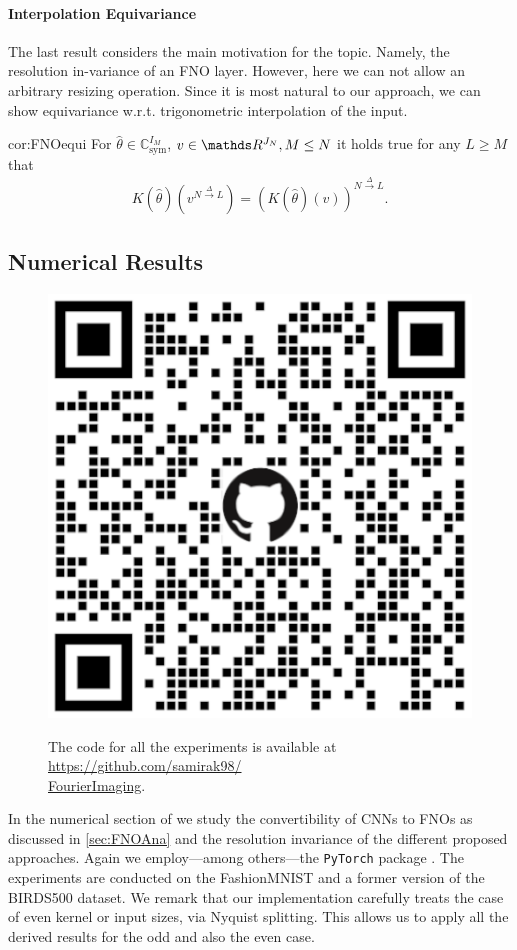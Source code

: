\paragraph{Interpolation Equivariance}
%
%
The last result considers the main motivation for the topic. Namely, the resolution in-variance of an FNO layer. However, here we can not allow an arbitrary resizing operation. Since it is most natural to our approach, we can show equivariance w.r.t. trigonometric interpolation of the input.
%
%
\begin{corollary}{}{cor:FNOequi}
	For $\hat{\theta} \in \mathbb{C}^{I_M}_{\text{sym}}$, $v \in \R^{J_N}, M \leq N$ it holds true for any $L \geq M$ that
	\begin{align*}
		K(\hat{\theta})(v^{N \xrightarrow{\Delta} L}) = \left( K(\hat{\theta})(v) \right)^{N \xrightarrow{\Delta} L}.
	\end{align*}
\end{corollary}


\subsection{Numerical Results}\label{sec:FNONum}
%
%
\begin{figure}
\begin{center}
	\includegraphics[width=.4\textwidth]{atelier/FNO/FNOQR.png}
\end{center}
The code for all the experiments is available at \href{https://github.com/samirak98/FourierImaging}{https://github.com/samirak98/}\\
\href{https://github.com/samirak98/FourierImaging}{FourierImaging}.
\end{figure}
%
%
In the numerical section of \cite{kabri2023resolution} we study the convertibility of CNNs to FNOs as discussed in \cref{sec:FNOAna} and the resolution invariance of the different proposed approaches. Again we employ---among others---the \texttt{PyTorch} package \cite{paszke2019pytorch}. The experiments are conducted on the FashionMNIST \cite{Han17} and a former version of the BIRDS500 \cite{pio450} dataset. We remark that our implementation carefully treats the case of even kernel or input sizes, via Nyquist splitting. This allows us to apply all the derived results for the odd and also the even case.
%
%
